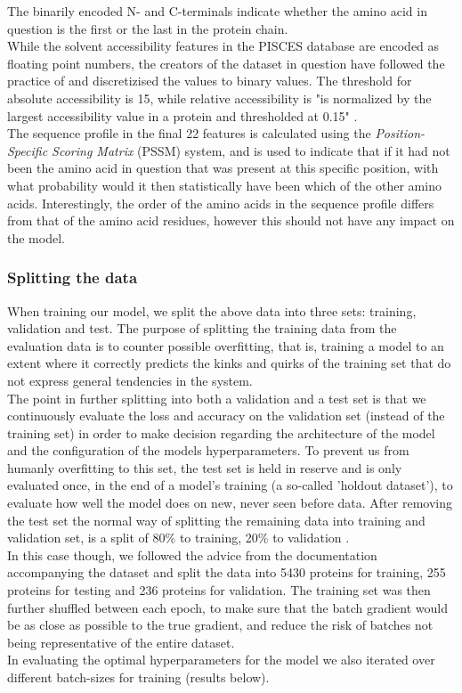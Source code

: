 \begin{multicols}{2}
\noindent The binarily encoded N- and C-terminals indicate whether the amino acid in question is the first or the last in the protein chain.\\
While the solvent accessibility features in the PISCES database are encoded as floating point numbers, the creators of the dataset in question have followed the practice of \citeauthor{qi-et-al-2012} and discretizised the values to binary values. The threshold for absolute accessibility is 15, while relative accessibility is "is normalized by the largest accessibility value in a protein and thresholded at 0.15" \citep{zhou-and-troyanskaya-2014}.\\
The sequence profile in the final 22 features is calculated using the \textit{Position-Specific Scoring Matrix} (PSSM) system, and is used to indicate that if it had not been the amino acid in question that was present at this specific position, with what probability would it then statistically have been which of the other amino acids. Interestingly, the order of the amino acids in the sequence profile differs from that of the amino acid residues, however this should not have any impact on the model.


\subsubsection{Splitting the data}
When training our model, we split the above data into three sets: training, validation and test. The purpose of splitting the training data from the evaluation data is to counter possible overfitting, that is, training a model to an extent where it correctly predicts the kinks and quirks of the training set that do not express general tendencies in the system.\\
The point in further splitting into both a validation and a test set is that we continuously evaluate the loss and accuracy on the validation set (instead of the training set) in order to make decision regarding the architecture of the model and the configuration of the models hyperparameters. To prevent us from humanly overfitting to this set, the test set is held in reserve and is only evaluated once, in the end of a model's training (a so-called 'holdout dataset'), to evaluate how well the model does on new, never seen before data. After removing the test set the normal way of splitting the remaining data into training and validation set, is a split of 80\% to training, 20\% to validation \citep[p. 119]{goodfellow-et-al-2016}.\\
In this case though, we followed the advice from the documentation accompanying the dataset and split the data into 5430 proteins for training, 255 proteins for testing and 236 proteins for validation. The training set was then further shuffled between each epoch, to make sure that the batch gradient would be as close as possible to the true gradient, and reduce the risk of batches not being representative of the entire dataset.\\
In evaluating the optimal hyperparameters for the model we also iterated over different batch-sizes for training (results below).


\end{multicols}

